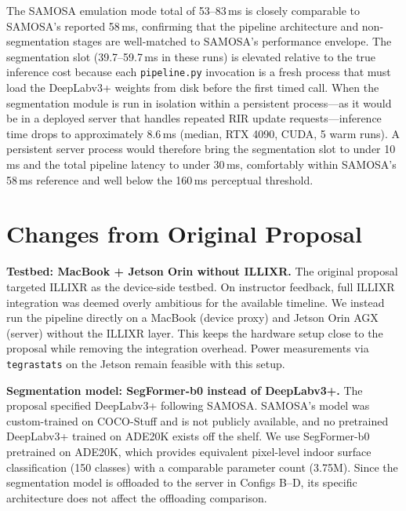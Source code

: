 \documentclass[11pt]{article}
\begin{document}
The SAMOSA emulation mode total of 53--83\,ms is closely comparable to SAMOSA's
reported 58\,ms, confirming that the pipeline architecture and non-segmentation
stages are well-matched to SAMOSA's performance envelope. The segmentation slot
(39.7--59.7\,ms in these runs) is elevated relative to the true inference cost
because each \texttt{pipeline.py} invocation is a fresh process that must load
the DeepLabv3+ weights from disk before the first timed call. When the
segmentation module is run in isolation within a persistent process---as it
would be in a deployed server that handles repeated RIR update
requests---inference time drops to approximately 8.6\,ms (median, RTX 4090,
CUDA, 5 warm runs). A persistent server process would therefore bring the
segmentation slot to under 10\,ms and the total pipeline latency to under
30\,ms, comfortably within SAMOSA's 58\,ms reference and well below the
160\,ms perceptual threshold.

\section{Changes from Original Proposal}

\textbf{Testbed: MacBook + Jetson Orin without ILLIXR.}
The original proposal targeted ILLIXR as the device-side testbed. On instructor
feedback, full ILLIXR integration was deemed overly ambitious for the available
timeline. We instead run the pipeline directly on a MacBook (device proxy) and
Jetson Orin AGX (server) without the ILLIXR layer. This keeps the hardware
setup close to the proposal while removing the integration overhead. Power
measurements via \texttt{tegrastats} on the Jetson remain feasible with this setup.

\textbf{Segmentation model: SegFormer-b0 instead of DeepLabv3+.}
The proposal specified DeepLabv3+ following SAMOSA. SAMOSA's model was
custom-trained on COCO-Stuff and is not publicly available, and no pretrained
DeepLabv3+ trained on ADE20K exists off the shelf. We use SegFormer-b0
pretrained on ADE20K, which provides equivalent pixel-level indoor surface
classification (150 classes) with a comparable parameter count (3.75M).
Since the segmentation model is offloaded to the server in Configs B--D,
its specific architecture does not affect the offloading comparison.

\end{document}
